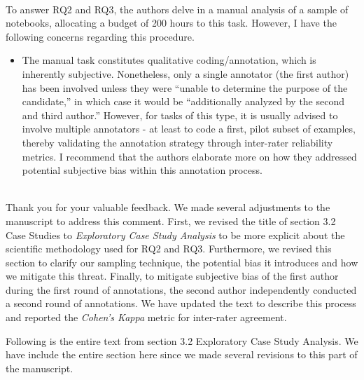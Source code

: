 \documentclass[11pt,fleqn]{article}
\newcommand{\eline}{\vspace*{.75\baselineskip}}
\newcommand{\Referee}[1]{\eline \noindent {\bf Reviewer comment #1:} \\}
\newcommand{\Us}{\eline \noindent {\bf Response:}\\}
\newenvironment{revcomment}[1][]
{\Referee{#1}\begin{rcomment}}
{\end{rcomment}}
\begin{document}
\begin{revcomment}[1.5]
  To answer RQ2 and RQ3, the authors delve in a manual analysis of a sample of notebooks, allocating a budget of 200 hours to this task. However, I have the following concerns regarding this procedure.

  \begin{itemize}
  \item The manual task constitutes qualitative coding/annotation, which is inherently subjective. Nonetheless, only a single annotator (the first author) has been involved unless they were ``unable to determine the purpose of the candidate,'' in which case it would be ``additionally analyzed by the second and third author.'' However, for tasks of this type, it is usually advised to involve multiple annotators - at least to code a first, pilot subset of examples, thereby validating the annotation strategy through inter-rater reliability metrics. I recommend that the authors elaborate more on how they addressed potential subjective bias within this annotation process.
  \end{itemize}
\end{revcomment}

\Us Thank you for your valuable feedback. We made several adjustments to the manuscript to address this comment. First, we revised the title of section 3.2 Case Studies to \emph{Exploratory Case Study Analysis} to be more explicit about the scientific methodology used for RQ2 and RQ3. Furthermore, we revised this section to clarify our sampling technique, the potential bias it introduces and how we mitigate this threat. Finally, to mitigate subjective bias of the first author during the first round of annotations, the second author independently conducted a second round of annotations. We have updated the text to describe this process and reported the \emph{Cohen's Kappa} metric for inter-rater agreement.

Following is the entire text from section 3.2 Exploratory Case Study Analysis. We have include the entire section here since we made several revisions to this part of the manuscript.
\end{document}
